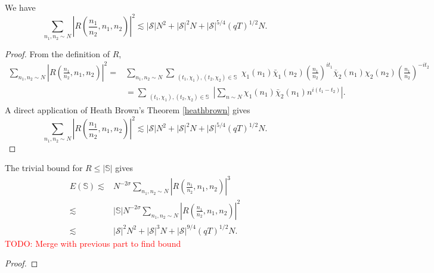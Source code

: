 \begin{lemma}
    We have 
\[
        \sum_{n_1,n_2\sim N}\left|R\left(\frac{n_1}{n_2},n_1,n_2\right) \right|^2\lesssim |\mathcal{S}|N^2+ |\mathcal{S}|^2N + |\mathcal{S}|^{5/4}(qT)^{1/2}N.
    \]
\end{lemma}
\begin{proof}
    From the definition of $R$, \begin{align*}
        \sum_{n_1,n_2\sim N}\left|R\left(\frac{n_1}{n_2},n_1,n_2\right) \right|^2=& \sum_{n_1,n_2\sim N}\sum_{\substack{(t_1,\chi_1),(t_2,\chi_2)\in \mathbb{S}}}
        \chi_1(n_1)\bar{\chi}_1(n_2)\left(\frac{n_1}{n_2}\right)^{it_1}\bar{\chi}_2(n_1){\chi}_2(n_2)\left(\frac{n_1}{n_2}\right)^{-it_2}
        \\
        &=\sum_{\substack{(t_1,\chi_1),(t_2,\chi_2)\in \mathbb{S}}}\left|\sum_{n\sim N}
        \chi_1(n_1)\bar{\chi}_2(n_1)n^{i(t_1-t_2)}\right|.
    \end{align*}
    A direct application of Heath Brown's Theorem \ref{heathbrown} gives \[
        \sum_{n_1,n_2\sim N}\left|R\left(\frac{n_1}{n_2},n_1,n_2\right) \right|^2\lesssim |\mathcal{S}|N^2+ |\mathcal{S}|^2N + |\mathcal{S}|^{5/4}(qT)^{1/2}N.
    \]
\end{proof}
The trivial bound for $R\leq |\mathbb{S}|$ gives \begin{align*}
    E(\mathbb{S})\lesssim& N^{-2\sigma}\sum_{n_1,n_2\sim N}\left|R\left(\frac{n_1}{n_2},n_1,n_2\right) \right|^3\\
    \lesssim &|\mathbb{S}|N^{-2\sigma}\sum_{n_1,n_2\sim N}\left|R\left(\frac{n_1}{n_2},n_1,n_2\right) \right|^2\\
    \lesssim& |\mathcal{S}|^2N^2+ |\mathcal{S}|^3N + |\mathcal{S}|^{9/4}(qT)^{1/2}N.
\end{align*}
\textcolor{red}{TODO: Merge with previous part to find bound}


\begin{lemma}
    
\end{lemma}

\begin{proof}
    
\end{proof}